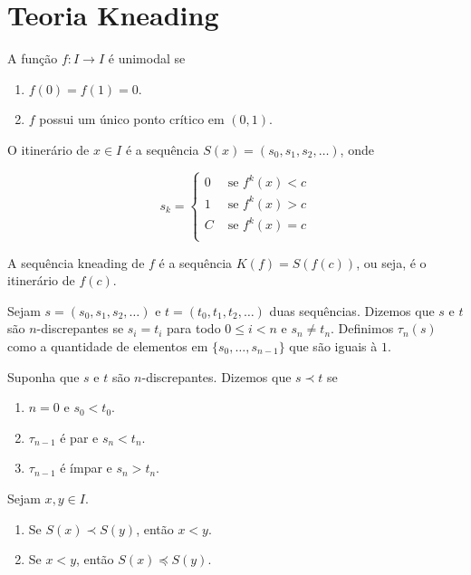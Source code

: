 \section{Teoria Kneading}

\begin{definition}
A função $f: I \to I$ é unimodal se
\begin{enumerate}
\item $f(0) = f(1) = 0$.
\item $f$ possui um único ponto crítico em $(0, 1)$.
\end{enumerate}
\end{definition}

\begin{definition}
O itinerário de $x \in I$ é  a sequência $S(x) = (s_0, s_1, s_2, \dots)$, onde

\[ s_k = 
\begin{cases} 
  0 & \textrm{ se } f^k(x) < c \\
  1 & \textrm{ se } f^k(x) > c \\
  C & \textrm{ se } f^k(x) = c \\
\end{cases}
\]
\end{definition}

\begin{definition}
A sequência kneading de $f$ é a sequência $K(f) = S(f(c))$, ou seja, é o itinerário de $f(c)$.
\end{definition}

Sejam $s = (s_0, s_1, s_2, \dots)$ e $t = (t_0, t_1, t_2, \dots)$ duas sequências. Dizemos que $s$ e $t$ são $n$-discrepantes se $s_i = t_i$ para todo $0 \leq i < n$ e $s_n \neq t_n$. Definimos $\tau_n(s)$ como a quantidade de elementos em $\{ s_0, \dots, s_{n-1} \}$ que são iguais à $1$.

\begin{definition}
Suponha que $s$ e $t$ são $n$-discrepantes. Dizemos que $s \prec t$ se
\begin{enumerate}
\item $n = 0$ e $s_0 < t_0$.
\item $\tau_{n-1}$ é par e $s_n < t_n$.
\item $\tau_{n-1}$ é ímpar e $s_n > t_n$.
\end{enumerate}
\end{definition}

\begin{theorem}
Sejam $x, y \in I$.
\begin{enumerate}
\item Se $S(x) \prec S(y)$, então $x < y$.
\item Se $x < y$, então $S(x) \preceq S(y)$.
\end{enumerate}
\end{theorem}

